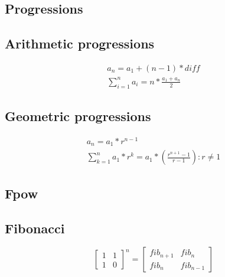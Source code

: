 
\subsection{Progressions}
\subsection*{Arithmetic progressions}
\vspace{-10pt}
\begin{gather*}
a_n = a_1 + (n - 1) * diff \\
\sum_{i = 1}^n a_i = n * \frac{a_1 + a_n}{2} 
\end{gather*}
\vspace{-25pt}

\subsection*{Geometric progressions}
\vspace{-10pt}
\begin{gather*}
a_n = a_1 * r^{n - 1} \\
\sum_{k = 1}^{n} a_{1} * r^k = a_1 * \left( \frac{r^{n + 1} - 1}{r - 1} \right): r \neq 1
\end{gather*}
\vspace{-20pt}


\subsection{Fpow}

\subsection{Fibonacci}
\[
\begin{bmatrix}
    1  &  1      \\
    1  &  0      
\end{bmatrix}^{n}
= 
\begin{bmatrix}
    fib_{n+1}  &  fib_{n}      \\
    fib_{n}  &  fib_{n-1}      
\end{bmatrix} 
\]

